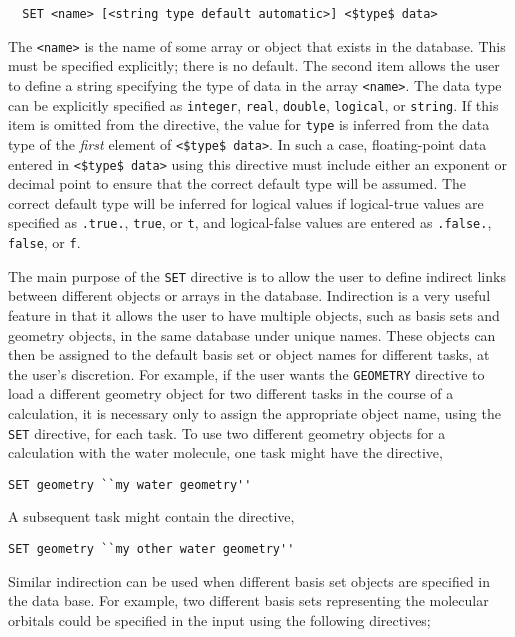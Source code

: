\begin{verbatim}
  SET <name> [<string type default automatic>] <$type$ data>
\end{verbatim}

The \verb+<name>+ is the name of some array or object that exists in
the database.  This must be specified explicitly; there is no default.
The second item allows the user to define a string specifying the type
of data in the array \verb+<name>+.  The data type can be explicitly 
specified as \verb+integer+,
\verb+real+, \verb+double+, \verb+logical+, or \verb+string+.  If
this item is omitted from the directive, the value for \verb+type+ is
inferred from the data type of the {\em first} element of
\verb+<$type$ data>+.  In such a case, floating-point data entered in 
\verb+<$type$ data>+ using this directive must include either an 
exponent or decimal point to ensure that the correct default type will 
be assumed.  The correct default type will be inferred for logical values 
if logical-true values are specified as \verb+.true.+, \verb+true+, or
\verb+t+, and logical-false values are entered as \verb+.false.+, 
\verb+false+, or \verb+f+.

The main purpose of the \verb+SET+ directive is to allow the user to
define indirect links between different objects or arrays in the database.  
Indirection is a very useful 
feature in that it allows the user to have multiple objects, such as
basis sets and geometry objects, in the same database under unique 
names.  These objects can then be assigned to the default basis set or 
object names for different tasks, at the
user's discretion.  For example, if the user wants the \verb+GEOMETRY+
directive to load a different geometry object for two different tasks in
the course of a calculation, it is necessary only to assign the appropriate
object name, using the \verb+SET+ directive, for each task.  To use two 
different geometry objects for a calculation with the water molecule, one
task might have the directive,

\begin{verbatim}
SET geometry ``my water geometry''
\end{verbatim}

A subsequent task might contain the directive,

\begin{verbatim}
SET geometry ``my other water geometry''
\end{verbatim}

Similar indirection can be used when different basis set objects 
are specified in the data base.  For example, two different basis
sets representing the molecular orbitals could be specified in the input 
using the following directives;

